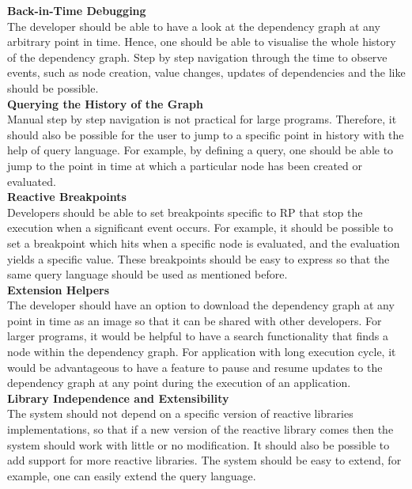 \textbf{Back-in-Time Debugging}
\\
The developer should be able to have a look at the dependency graph at any arbitrary point in time. Hence, one should be able to visualise the whole history of the dependency graph. Step by step navigation through the time to observe events, such as node creation, value changes, updates of dependencies and the like should be possible. \\


\textbf{Querying the History of the Graph}
\\
Manual step by step navigation is not practical for large programs. Therefore, it should also be possible for the user to jump to a specific point in history with the help of query language.
For example, by defining a query, one should be able to jump to the point in time at which a particular node has been created or evaluated.\\


\textbf{Reactive Breakpoints}
\\
Developers should be able to set breakpoints specific to RP that stop the execution when a significant event occurs. For example, it should be possible to set a breakpoint which hits when a specific node is evaluated, and the evaluation yields a specific value. These breakpoints should be easy to express so that the same query language should be used as mentioned before.\\


\textbf{Extension Helpers}
\\
The developer should have an option to download the dependency graph at any point in time as an image so that it can be shared with other developers. For larger programs, it would be helpful to have a search functionality that finds a node within the dependency graph. For application with long execution cycle, it would be advantageous to have a feature to pause and resume updates to the dependency graph at any point during the execution of an application. \\


\textbf{Library Independence and Extensibility}
\\
The system should not depend on a specific version of reactive libraries implementations, so that if a new version of the reactive library comes then the system should work with little or no modification. It should also be possible to add support for more reactive libraries. The system should be easy to extend, for example, one can easily extend the query language.



